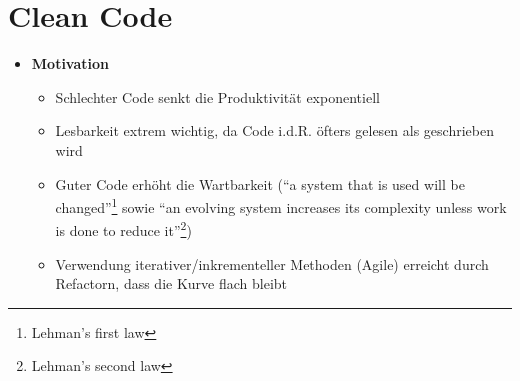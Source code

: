 \section{Clean Code}
\begin{itemize}
	\item \textbf{Motivation}
	\begin{itemize}
		\item Schlechter Code senkt die Produktivität exponentiell
		\item Lesbarkeit extrem wichtig, da Code i.d.R. öfters gelesen als geschrieben wird
		\item Guter Code erhöht die Wartbarkeit ("`a system that is used will be changed"'\footnote{Lehman's first law} sowie "`an evolving system increases its complexity unless work is done to reduce it"'\footnote{Lehman's second law})
		\item Verwendung iterativer/inkrementeller Methoden (Agile) erreicht durch Refactorn, dass die Kurve flach bleibt
	\end{itemize}
\end{itemize}


